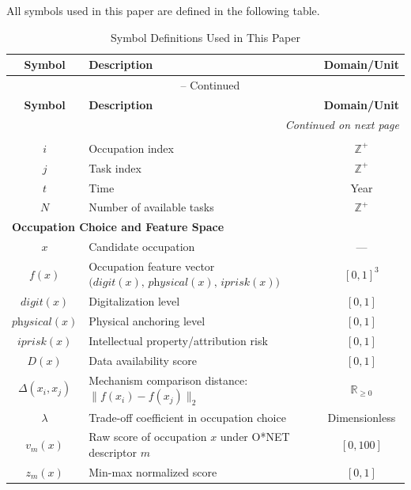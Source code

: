 All symbols used in this paper are defined in the following table.\begin{longtable}{clc}
\caption{Symbol Definitions Used in This Paper} \label{tab:notation_unified} \\
\toprule
\textbf{Symbol} & \textbf{Description} & \textbf{Domain/Unit} \\
\midrule
\endfirsthead
\multicolumn{3}{c}{\tablename\ \thetable{} -- Continued} \\
\toprule
\textbf{Symbol} & \textbf{Description} & \textbf{Domain/Unit} \\
\midrule
\endhead
\midrule
\multicolumn{3}{r}{\textit{Continued on next page}} \\
\endfoot
\bottomrule
\endlastfoot

\multicolumn{3}{l}{\textbf{Basic Indices}} \\
\midrule
$i$ & Occupation index & $\mathbb{Z}^+$ \\
$j$ & Task index & $\mathbb{Z}^+$ \\
$t$ & Time & Year \\
$N$ & Number of available tasks & $\mathbb{Z}^+$ \\
\midrule

\multicolumn{3}{l}{\textbf{Occupation Choice and Feature Space}} \\
\midrule
$x$ & Candidate occupation & --- \\
$f(x)$ & Occupation feature vector $\big(\textit{digit}(x),\,\textit{physical}(x),\,\textit{iprisk}(x)\big)$ & $[0,1]^3$ \\
$\textit{digit}(x)$ & Digitalization level & $[0,1]$ \\
$\textit{physical}(x)$ & Physical anchoring level & $[0,1]$ \\
$\textit{iprisk}(x)$ & Intellectual property/attribution risk & $[0,1]$ \\
$D(x)$ & Data availability score & $[0,1]$ \\
$\Delta(x_i,x_j)$ & Mechanism comparison distance: $\lVert f(x_i)-f(x_j)\rVert_2$ & $\mathbb{R}_{\ge 0}$ \\
$\lambda$ & Trade-off coefficient in occupation choice & Dimensionless \\
$v_m(x)$ & Raw score of occupation $x$ under O*NET descriptor $m$ & $[0,100]$ \\
$z_m(x)$ & Min-max normalized score & $[0,1]$ \\
\midrule


\end{longtable}
